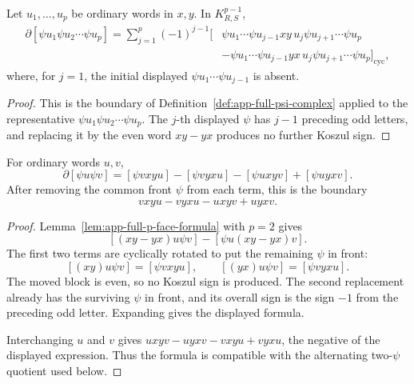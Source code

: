 \begin{lem}
\label{lem:app-full-p-face-formula}
  Let \(u_1,\ldots,u_p\) be ordinary words in \(x,y\).  In
  \(K^{p-1}_{R,S}\),
  \[
  \begin{aligned}
    \partial[\psi u_1\psi u_2\cdots\psi u_p]
      =
      \sum_{j=1}^p(-1)^{j-1}
      [&\psi u_1\cdots\psi u_{j-1}xy\,u_j\psi u_{j+1}\cdots\psi u_p\\
       &-\psi u_1\cdots\psi u_{j-1}yx\,u_j\psi u_{j+1}\cdots\psi u_p]_{\mathrm{cyc}},
  \end{aligned}
  \]
  where, for \(j=1\), the initial displayed \(\psi u_1\cdots\psi u_{j-1}\)
  is absent.
\end{lem}

\begin{proof}
  This is the boundary of Definition~\ref{def:app-full-psi-complex} applied
  to the representative \(\psi u_1\psi u_2\cdots\psi u_p\).  The \(j\)-th
  displayed \(\psi\) has \(j-1\) preceding odd letters, and replacing it by
  the even word \(xy-yx\) produces no further Koszul sign.
\end{proof}

\begin{lem}
\label{lem:app-full-two-psi-boundary-sign}
  For ordinary words \(u,v\),
  \[
    \partial[\psi u\psi v]
      =[\psi vxyu]-[\psi vyxu]-[\psi uxyv]+[\psi uyxv].
  \]
  After removing the common front \(\psi\) from each term, this is the
  boundary
  \[
    vxyu-vyxu-uxyv+uyxv.
  \]
\end{lem}

\begin{proof}
  Lemma~\ref{lem:app-full-p-face-formula} with \(p=2\) gives
  \[
    [(xy-yx)u\psi v]-[\psi u(xy-yx)v].
  \]
  The first two terms are cyclically rotated to put the remaining \(\psi\) in
  front:
  \[
    [(xy)u\psi v]=[\psi vxyu],\qquad
    [(yx)u\psi v]=[\psi vyxu].
  \]
  The moved block is even, so no Koszul sign is produced.  The second
  replacement already has the surviving \(\psi\) in front, and its overall
  sign is the sign \(-1\) from the preceding odd letter.  Expanding gives the
  displayed formula.

  Interchanging \(u\) and \(v\) gives
  \(uxyv-uyxv-vxyu+vyxu\), the negative of the displayed expression.  Thus
  the formula is compatible with the alternating two-\(\psi\) quotient used
  below.
\end{proof}

